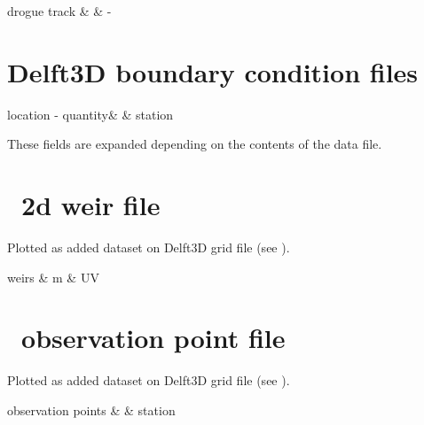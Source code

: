 \begin{QUL-table}
\STRUT
drogue track & & -
\end{QUL-table}



\section{Delft3D boundary condition files} \label{Sec:FileBCT}

\begin{QUL-table}
\STRUT
location - quantity\ENi & & station
\end{QUL-table}

\begin{enumerate_brackets}
\item These fields are expanded depending on the contents of the data file.
\end{enumerate_brackets}




\section{\DFLOW\ 2d weir file} \label{Sec:File2DW}

Plotted as added dataset on Delft3D grid file (see ).

\begin{QUL-table}
\STRUT
weirs & m & UV
\end{QUL-table}




\section{\DFLOW\ observation point file} \label{Sec:FileOBS}

Plotted as added dataset on Delft3D grid file (see ).

\begin{QUL-table}
\STRUT
observation points & & station
\end{QUL-table}




